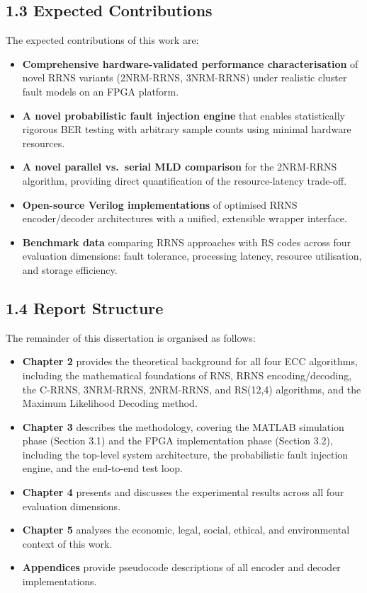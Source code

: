\subsection{1.3 Expected Contributions}\label{expected-contributions}

The expected contributions of this work are:

\begin{itemize}
\item
  \textbf{Comprehensive hardware-validated performance characterisation}
  of novel RRNS variants (2NRM-RRNS, 3NRM-RRNS) under realistic cluster
  fault models on an FPGA platform.
\item
  \textbf{A novel probabilistic fault injection engine} that enables
  statistically rigorous BER testing with arbitrary sample counts using
  minimal hardware resources.
\item
  \textbf{A novel parallel vs.~serial MLD comparison} for the 2NRM-RRNS
  algorithm, providing direct quantification of the resource-latency
  trade-off.
\item
  \textbf{Open-source Verilog implementations} of optimised RRNS
  encoder/decoder architectures with a unified, extensible wrapper
  interface.
\item
  \textbf{Benchmark data} comparing RRNS approaches with RS codes across
  four evaluation dimensions: fault tolerance, processing latency,
  resource utilisation, and storage efficiency.
\end{itemize}

\subsection{1.4 Report Structure}\label{report-structure}

The remainder of this dissertation is organised as follows:

\begin{itemize}
\item
  \textbf{Chapter 2} provides the theoretical background for all four
  ECC algorithms, including the mathematical foundations of RNS, RRNS
  encoding/decoding, the C-RRNS, 3NRM-RRNS, 2NRM-RRNS, and RS(12,4)
  algorithms, and the Maximum Likelihood Decoding method.
\item
  \textbf{Chapter 3} describes the methodology, covering the MATLAB
  simulation phase (Section 3.1) and the FPGA implementation phase
  (Section 3.2), including the top-level system architecture, the
  probabilistic fault injection engine, and the end-to-end test loop.
\item
  \textbf{Chapter 4} presents and discusses the experimental results
  across all four evaluation dimensions.
\item
  \textbf{Chapter 5} analyses the economic, legal, social, ethical, and
  environmental context of this work.
\item
  \textbf{Appendices} provide pseudocode descriptions of all encoder and
  decoder implementations.
\end{itemize}

